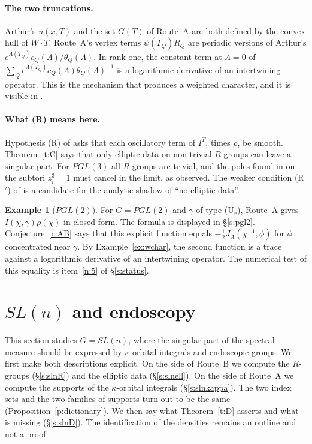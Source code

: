 \documentclass[12pt,letterpaper]{article}
\numberwithin{equation}{section}
\theoremstyle{plain}
\theoremstyle{definition}
\newtheorem{example}[theorem]{Example}
\theoremstyle{remark}
\begin{document}
\paragraph{The two truncations.} Arthur's $u(x,T)$ and the set $G(T)$ of Route~A are both defined by the convex hull of $W\cdot T$. Route~A's vertex terms $\psi(T_Q)R_Q$ \cite[Lemma~3.5A]{JC26} are periodic versions of Arthur's $e^{\Lambda(T_Q)}c_Q(\Lambda)/\theta_Q(\Lambda)$. In rank one, the constant term at $\Lambda=0$ of $\sum_Qe^{\Lambda(T_Q)}c_Q(\Lambda)\theta_Q(\Lambda)^{-1}$ is a logarithmic derivative of an intertwining operator. This is the mechanism that produces a weighted character, and it is visible in \cite[(6.5)]{JC26}.

\paragraph{What (R) means here.} Hypothesis (R) of \cite{JC26} asks that each oscillatory term of $I^T$, times $\rho$, be smooth. Theorem~\ref{t:C} says that only elliptic data on non-trivial $R$-groups can leave a singular part. For $PGL(3)$ all $R$-groups are trivial, and the poles found in \cite[App.~A]{JC26} on the subtori $z_i^3=1$ must cancel in the limit, as observed. The weaker condition (R$'$) of \cite[Rem.~2026.20]{JC26} is a candidate for the analytic shadow of ``no elliptic data''.

\begin{example}[$PGL(2)$]\label{ex:compare}
For $G=PGL(2)$ and $\gamma$ of type (U$_r$), Route~A gives $I(\chi,\gamma)\rho(\chi)$ in closed form. The formula is displayed in \S\ref{s:pgl2}. Conjecture~\ref{c:AB} says that this explicit function equals $-\frac12J_A(\chi^{-1},\phi)$ for $\phi$ concentrated near $\gamma$. By Example~\ref{ex:wchar}, the second function is a trace against a logarithmic derivative of an intertwining operator. The numerical test of this equality is item~\ref{n:5} of \S\ref{s:status}.
\end{example}

\section{\texorpdfstring{$SL(n)$}{SL(n)} and endoscopy}\label{s:endo}

This section studies $G=SL(n)$, where the singular part of the spectral measure should be expressed by $\kappa$-orbital integrals and endoscopic groups. We first make both descriptions explicit. On the side of Route~B we compute the $R$-groups (\S\ref{s:slnR}) and the elliptic data (\S\ref{s:slnell}). On the side of Route~A we compute the supports of the $\kappa$-orbital integrals (\S\ref{s:slnkappa}). The two index sets and the two families of supports turn out to be the same (Proposition~\ref{p:dictionary}). We then say what Theorem~\ref{t:D} asserts and what is missing (\S\ref{s:slnD}). The identification of the densities remains an outline and not a proof.
\end{document}

